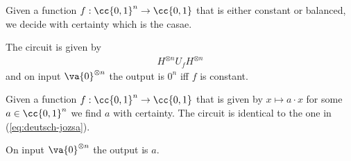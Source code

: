 \documentclass{article}
\begin{document}
\begin{algorithm}\label{alg:deutsch-jozsa}
  Given a function $f:\cc{0,1}^n\to\cc{0,1}$ that is either constant or balanced,
  we decide with certainty which is the casae.

  The circuit is given by
  \begin{align}
    \label{eq:deutsch-jozsa}
    H^{\otimes n} U_f H^{\otimes n}
  \end{align}
  and on input $\va{0}^{\otimes n}$ the output is $0^n$ iff $f$ is constant.
\end{algorithm}

\begin{algorithm}\label{alg:bernstein-vazirani}
  Given a function $f:\cc{0,1}^n\to\cc{0,1}$ that is given by $x\mapsto a\cdot x$ for some
  $a\in\cc{0,1}^n$ we find $a$ with certainty. The circuit is identical to the one in
  (\ref{eq:deutsch-jozsa}).

  On input $\va{0}^{\otimes n}$ the output is $a$.
\end{algorithm}
\end{document}
